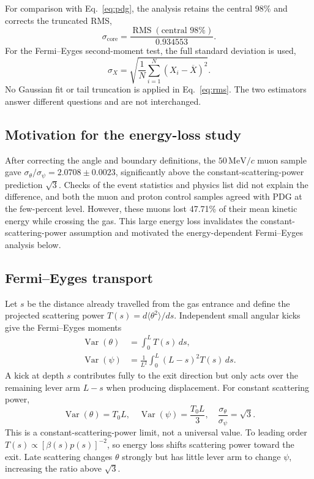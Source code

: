 \documentclass[10pt,letterpaper]{article}
\newcommand{\MeVc}{\,\mathrm{MeV}/c}
\begin{document}
For comparison with Eq.~\eqref{eq:pdg}, the analysis retains the central 98\%
and corrects the truncated RMS,
\begin{equation}
\sigma_{\mathrm{core}}=\frac{\operatorname{RMS}(\text{central 98\%})}{0.934553}.
\label{eq:core}
\end{equation}
For the Fermi--Eyges second-moment test, the full standard deviation is used,
\begin{equation}
\sigma_X=\sqrt{\frac{1}{N}\sum_{i=1}^{N}(X_i-\overline X)^2}.
\label{eq:rms}
\end{equation}
No Gaussian fit or tail truncation is applied in Eq.~\eqref{eq:rms}. The two
estimators answer different questions and are not interchanged.

\subsection{Motivation for the energy-loss study}

After correcting the angle and boundary definitions, the $50\MeVc$ muon
sample gave $\sigma_\theta/\sigma_\psi=2.0708\pm0.0023$, significantly above
the constant-scattering-power prediction $\sqrt{3}$. Checks of the event
statistics and physics list did not explain the difference, and both the muon
and proton control samples agreed with PDG at the few-percent level. However,
these muons lost 47.71\% of their mean kinetic
energy while crossing the gas. This large energy loss invalidates the
constant-scattering-power assumption and motivated the energy-dependent
Fermi--Eyges analysis below.

\subsection{Fermi--Eyges transport}

Let $s$ be the distance already travelled from the gas entrance and define the
projected scattering power $T(s)=d\langle\theta^2\rangle/ds$. Independent small
angular kicks give the Fermi--Eyges moments \cite{Eyges1948,Gottschalk2010}
\begin{align}
\operatorname{Var}(\theta)&=\int_0^L T(s)\,ds,\\
\operatorname{Var}(\psi)&=\frac{1}{L^2}\int_0^L(L-s)^2T(s)\,ds.
\label{eq:FE}
\end{align}
A kick at depth $s$ contributes fully to the exit direction but only acts over
the remaining lever arm $L-s$ when producing displacement. For constant
scattering power,
\begin{equation}
\operatorname{Var}(\theta)=T_0L,\quad
\operatorname{Var}(\psi)=\frac{T_0L}{3},\quad
\frac{\sigma_\theta}{\sigma_\psi}=\sqrt{3}.
\label{eq:sqrt3}
\end{equation}
This is a constant-scattering-power limit, not a universal value. To leading
order $T(s)\propto[\beta(s)p(s)]^{-2}$, so energy loss shifts scattering power
toward the exit. Late scattering changes $\theta$ strongly but has little lever
arm to change $\psi$, increasing the ratio above $\sqrt{3}$.
\end{document}
